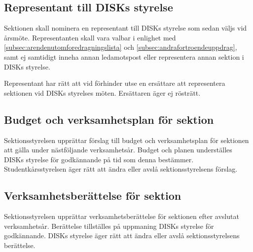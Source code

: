 	\subsection{Representant till DISKs styrelse}
	\label {subsec:representanttilldisksstyrelse}
		Sektionen skall nominera en representant till DISKs styrelse som sedan väljs vid årsmöte. Representanten skall vara valbar i enlighet med \ref{subsec:arendenutomforedragningslista} och \ref{subsec:andrafortroendeuppdrag}, samt ej samtidigt inneha annan ledamotspost eller representera annan sektion i DISKs styrelse.\par
		Representant har rätt att vid förhinder utse en ersättare att representera sektionen vid DISKs styrelses möten. Ersättaren äger ej rösträtt.

	\subsection{Budget och verksamhetsplan för sektion}
	\label{subsec:budgetochverksamhetsplanforsektion}
		Sektionsstyrelsen upprättar förslag till budget och verksamhetsplan för sektionen att gälla under nästföljande verksamhetsår. Budget och planen underställes DISKs styrelse för godkännande på tid som denna bestämmer. Studentkårsstyrelsen äger rätt att ändra eller avslå sektionsstyrelsens förslag.

	\subsection{Verksamhetsberättelse för sektion}
	\label{subsec:verksamhetsberattelseforsektion}
		Sektionsstyrelsen upprättar verksamhetsberättelse för sektionen efter avslutat verksamhetsår. Berättelse tillställes på uppmaning DISKs styrelse för godkännande. DISKs styrelse äger rätt att ändra eller avslå sektionsstyrelsens berättelse.
